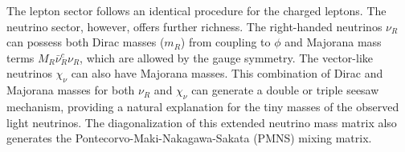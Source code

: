 The lepton sector follows an identical procedure for the charged leptons. The neutrino sector, however, offers further richness. The right-handed neutrinos $\nu_R$ can possess both Dirac masses ($m_R$) from coupling to $\phi$ and Majorana mass terms $M_R \bar{\nu}_R^c \nu_R$, which are allowed by the gauge symmetry. The vector-like neutrinos $\chi_\nu$ can also have Majorana masses. This combination of Dirac and Majorana masses for both $\nu_R$ and $\chi_\nu$ can generate a double or triple seesaw mechanism, providing a natural explanation for the tiny masses of the observed light neutrinos. The diagonalization of this extended neutrino mass matrix also generates the Pontecorvo-Maki-Nakagawa-Sakata (PMNS) mixing matrix.
